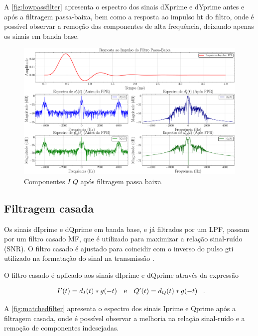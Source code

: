 A \autoref{fig:lowpassfilter} apresenta o espectro dos sinais \gls{dXprime} e \gls{dYprime} antes e após a filtragem passa-baixa, bem como a resposta ao impulso \gls{ht} do filtro, onde é possível observar a remoção das componentes de alta frequência, deixando apenas os sinais em banda base.

\begin{figure}[H]
	\centering
	\caption{Componentes $I$ $Q$ após filtragem passa baixa}\label{fig:lowpassfilter}
	\includegraphics[width=\linewidth]{assets/cap2/lowpassfilter.pdf}
\end{figure}

\subsection{Filtragem casada}

Os sinais \gls{dIprime} e \gls{dQprime} em banda base, e já filtrados por um \gls{LPF}, passam por um filtro casado \gls{MF}, que é utilizado para maximizar a relação sinal-ruído (\gls{SNR}). O filtro casado é ajustado para coincidir com o inverso do pulso  \gls{gti} utilizado na formatação do sinal na transmissão \cite{10555531840}. 

O filtro casado é aplicado aos sinais \gls{dIprime} e \gls{dQprime} através da expressão

\vspace{-1em}
\begin{equation}
    \begin{array}{c@{\quad\text{e}\quad}c}
        I'(t) = d_I(t) * g(-t) &
        Q'(t) = d_Q(t) * g(-t)
    \end{array} \text{ .}
\end{equation}


A \autoref{fig:matchedfilter} apresenta o espectro dos sinais \gls{Iprime} e \gls{Qprime} após a filtragem casada, onde é possível observar a melhoria na relação sinal-ruído e a remoção de componentes indesejadas. 


